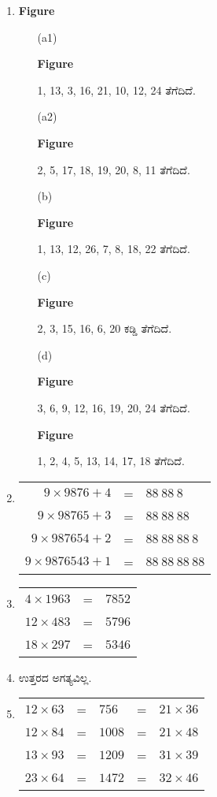 \begin{enumerate}
\item 
\begin{center}
{\bf Figure}
\end{center}
\begin{itemize}
\item[(a1)]  \begin{center}{\bf Figure}\end{center}
1, 13, 3, 16, 21, 10, 12, 24 ತೆಗೆದಿದೆ. 
\item[(a2)] \begin{center}{\bf Figure}\end{center}
2, 5, 17, 18, 19, 20, 8, 11 ತೆಗೆದಿದೆ. 
\item[(b)] \begin{center}{\bf Figure}\end{center}
1, 13, 12, 26, 7, 8, 18, 22 ತೆಗೆದಿದೆ. 
\item[(c)] \begin{center}{\bf Figure}\end{center}
2, 3, 15, 16, 6, 20 ಕಡ್ಡಿ ತೆಗೆದಿದೆ. 
\item[(d)] \begin{center}{\bf Figure}\end{center}
3, 6, 9, 12, 16, 19, 20, 24 ತೆಗೆದಿದೆ.
\begin{center}{\bf Figure}\end{center}
1, 2, 4, 5, 13, 14, 17, 18 ತೆಗೆದಿದೆ.
\end{itemize}

\item 
\begin{tabular}[t]{rcl}
$9\times 9876 + 4$ & = & $88~88~8$\\
$9\times 98765 + 3$ & = & $88~88~88$\\
$9\times 987654 + 2$ & = & $88~88~88~8$\\
$9\times 9876543 + 1$ & = & $88~88~88~88$
\end{tabular}

\item 
\begin{tabular}[t]{lll}
$4\times 1963$ & = & $7852$\\
$12\times 483$ & = & $5796$\\
$18\times 297$ & = & $5346$
\end{tabular}

\item ಉತ್ತರದ ಅಗತ್ಯವಿಲ್ಲ. 

\item 
\begin{tabular}[t]{lllll}
$12\times 63$ & = & $756$ & = & $21\times 36$\\
$12\times 84$ & = & $1008$ & = & $21\times 48$\\
$13\times 93$ & = & $1209$ & = & $31\times 39$\\
$23\times 64$ & = & $1472$ & = & $32\times 46$
\end{tabular}


\end{enumerate}
